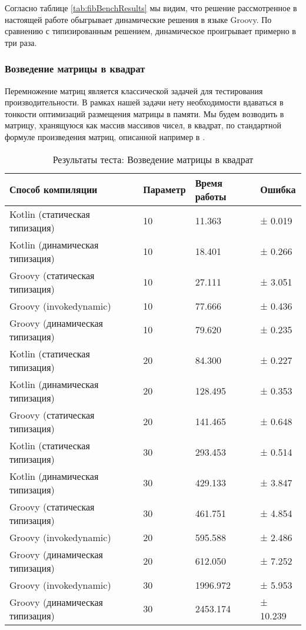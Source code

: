 Согласно таблице \ref{tab:fibBenchResults} мы видим, что решение рассмотренное в настоящей работе обыгрывает динамические решения в языке Groovy. По сравнению с типизированным решением, динамическое проигрывает примерно в три раза.


\subsubsection{Возведение матрицы в квадрат}

Перемножение матриц является классической задачей для тестирования производительности. В рамках нашей задачи нету необходимости вдаваться в тонкости оптимизаций размещения матрицы в памяти. Мы будем возводить в матрицу, хранящуюся как массив массивов чисел, в квадрат, по стандартной формуле произведения матриц, описанной например в \cite{book:KryakvinVadimDLinAlgebra}. 

\begin{table}[h]
\caption{\label{tab:matrixSquareBenchResults}Результаты теста: Возведение матрицы в квадрат}
\begin{center}
\begin{tabular}{|l|l|l|l|}
\hline
Способ компиляции & Параметр	& Время работы & Ошибка \\
\hline
Kotlin (статическая типизация)            & 10 &   11.363 & ±  0.019 \\
Kotlin (динамическая типизация)           & 10 &   18.401 & ±  0.266 \\
Groovy (статическая типизация)            & 10 &   27.111 & ±  3.051 \\
Groovy (invokedynamic)                    & 10 &   77.666 & ±  0.436 \\
Groovy (динамическая типизация)           & 10 &   79.620 & ±  0.235 \\
Kotlin (статическая типизация)            & 20 &   84.300 & ±  0.227 \\
Kotlin (динамическая типизация)           & 20 &  128.495 & ±  0.353 \\
Groovy (статическая типизация)            & 20 &  141.465 & ±  0.648 \\
Kotlin (статическая типизация)            & 30 &  293.453 & ±  0.514 \\
Kotlin (динамическая типизация)           & 30 &  429.133 & ±  3.847 \\
Groovy (статическая типизация)            & 30 &  461.751 & ±  4.854 \\
Groovy (invokedynamic)                    & 20 &  595.588 & ±  2.486 \\
Groovy (динамическая типизация)           & 20 &  612.050 & ±  7.252 \\
Groovy (invokedynamic)                    & 30 & 1996.972 & ±  5.953 \\
Groovy (динамическая типизация)           & 30 & 2453.174 & ± 10.239 \\
\hline
\end{tabular}
\end{center}
\end{table} 


